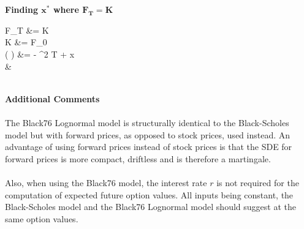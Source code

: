 \documentclass{article}
\begin{document}
\begin{minipage}[t]{0.5\textwidth}
	\begin{tcolorbox}[height=12.4cm,boxsep=5pt,arc=0pt,auto outer arc,colback=white,colframe=black]
		\noindent \textbf{Finding $\boldsymbol{x^*}$ where $\boldsymbol{F_T=K}$}
		\begin{flalign*}
		F_T &= K\\
		K &= F_0 \exp{}\\
		\log \left(  \right) &= - \sigma^2 T + \sigma {} x\\
		&
		\end{flalign*}\\
		\noindent \textbf{Additional Comments}\\ \\
		The Black76 Lognormal model is structurally identical to the Black-Scholes model but with forward prices, as opposed to stock prices, used instead. An advantage of using forward prices instead of stock prices is that the SDE for forward prices is more compact, driftless and is therefore a martingale.\\ \\
		Also, when using the Black76 model, the interest rate $r$ is not required for the computation of expected future option values. All inputs being constant, the Black-Scholes model and the Black76 Lognormal model should suggest at the same option values.
	\end{tcolorbox}
\end{minipage}\\ 
\end{document}
